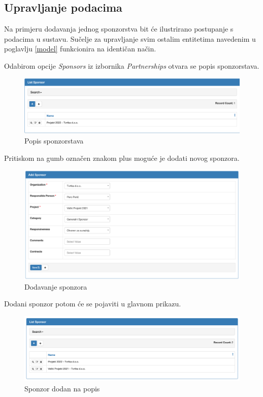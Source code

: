 \documentclass[times, utf8, diplomski]{fer}
\begin{document}
\subsection{Upravljanje podacima}

Na primjeru dodavanja jednog sponzorstva bit će ilustrirano postupanje s podacima u
sustavu. Sučelje za upravljanje svim ostalim entitetima navedenim u poglavlju
\ref{model} funkcionira na identičan način.

Odabirom opcije \emph{Sponsors} iz izbornika \emph{Partnerships} otvara se popis
sponzorstava.

\begin{figure}[H]
    \centering
    \includegraphics[width=1\textwidth]{slike/sponsormaster.png}
    \caption{Popis sponzorstava}
    \label{fig:listsponsors}
\end{figure}

Pritiskom na gumb označen znakom plus moguće je dodati novog sponzora.

\begin{figure}[H]
    \centering
    \includegraphics[width=1\textwidth]{slike/addsponsor.png}
    \caption{Dodavanje sponzora}
    \label{fig:addsponsor}
\end{figure}

Dodani sponzor potom će se pojaviti u glavnom prikazu.

\begin{figure}[H]
    \centering
    \includegraphics[width=1\textwidth]{slike/sponsoradded.png}
    \caption{Sponzor dodan na popis}
    \label{fig:sponsoradded}
\end{figure}
\end{document}
